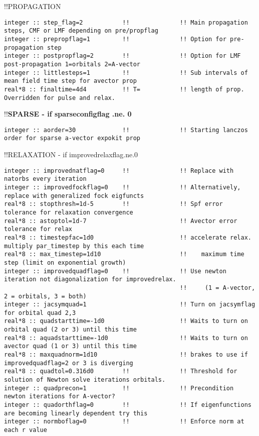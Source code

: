 !!{\large \quad PROPAGATION}
\begin{verbatim}
integer :: step_flag=2           !!              !! Main propagation steps, CMF or LMF depending on pre/propflag
integer :: prepropflag=1         !!              !! Option for pre-propagation step
integer :: postpropflag=2        !!              !! Option for LMF post-propagation 1=orbitals 2=A-vector
integer :: littlesteps=1         !!              !! Sub intervals of mean field time step for avector prop
real*8 :: finaltime=4d4          !! T=           !! length of prop.  Overridden for pulse and relax.  
\end{verbatim}
!!\textbf{\qquad SPARSE - if sparseconfigflag .ne. 0}
\begin{verbatim}
integer :: aorder=30             !!              !! Starting lanczos order for sparse a-vector expokit prop
\end{verbatim}
!!{\large \quad RELAXATION - if improvedrelaxflag.ne.0}
\begin{verbatim}
integer :: improvednatflag=0     !!              !! Replace with natorbs every iteration
integer :: improvedfockflag=0    !!              !! Alternatively, replace with generalized fock eigfuncts
real*8 :: stopthresh=1d-5        !!              !! Spf error tolerance for relaxation convergence
real*8 :: astoptol=1d-7                          !! Avector error tolerance for relax
real*8 :: timestepfac=1d0                        !! accelerate relax. multiply par_timestep by this each time
real*8 :: max_timestep=1d10                      !!    maximum time step (limit on exponential growth)
integer :: improvedquadflag=0    !!              !! Use newton iteration not diagonalization for improvedrelax.
                                                 !!     (1 = A-vector, 2 = orbitals, 3 = both)
integer :: jacsymquad=1                          !! Turn on jacsymflag for orbital quad 2,3
real*8 :: quadstarttime=-1d0                     !! Waits to turn on orbital quad (2 or 3) until this time
real*8 :: aquadstarttime=-1d0                    !! Waits to turn on avector quad (1 or 3) until this time
real*8 :: maxquadnorm=1d10                       !! brakes to use if improvedquadflag=2 or 3 is diverging
real*8 :: quadtol=0.316d0        !!              !! Threshold for solution of Newton solve iterations orbitals.
integer :: quadprecon=1          !!              !! Precondition newton iterations for A-vector?
integer :: quadorthflag=0        !!              !! If eigenfunctions are becoming linearly dependent try this
integer :: normboflag=0          !!              !! Enforce norm at each r value
\end{verbatim}
